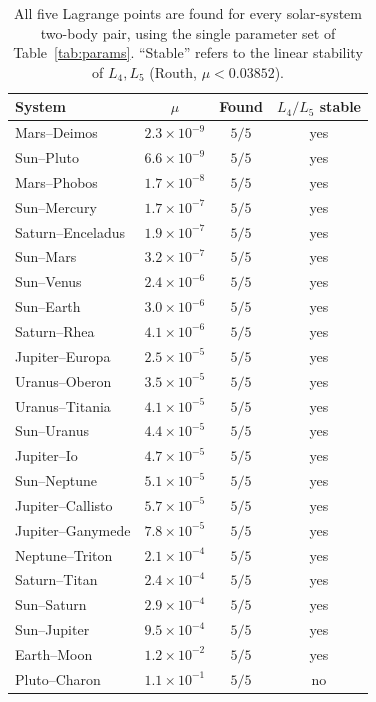 \documentclass[aip,preprint,amsmath,amssymb,floatfix]{revtex4-2}
\begin{document}
\begin{table}[ht]
\centering
\caption{All five Lagrange points are found for every solar-system two-body pair,
using the single parameter set of Table~\ref{tab:params}. ``Stable'' refers to
the linear stability of $L_4,L_5$ (Routh, $\mu<0.03852$).}
\label{tab:systems}
\begin{tabular}{lccc}
\toprule
System & $\mu$ & Found & $L_4/L_5$ stable\\
\midrule
Mars--Deimos      & $2.3\times10^{-9}$ & $5/5$ & yes\\
Sun--Pluto        & $6.6\times10^{-9}$ & $5/5$ & yes\\
Mars--Phobos      & $1.7\times10^{-8}$ & $5/5$ & yes\\
Sun--Mercury      & $1.7\times10^{-7}$ & $5/5$ & yes\\
Saturn--Enceladus & $1.9\times10^{-7}$ & $5/5$ & yes\\
Sun--Mars         & $3.2\times10^{-7}$ & $5/5$ & yes\\
Sun--Venus        & $2.4\times10^{-6}$ & $5/5$ & yes\\
Sun--Earth        & $3.0\times10^{-6}$ & $5/5$ & yes\\
Saturn--Rhea      & $4.1\times10^{-6}$ & $5/5$ & yes\\
Jupiter--Europa   & $2.5\times10^{-5}$ & $5/5$ & yes\\
Uranus--Oberon    & $3.5\times10^{-5}$ & $5/5$ & yes\\
Uranus--Titania   & $4.1\times10^{-5}$ & $5/5$ & yes\\
Sun--Uranus       & $4.4\times10^{-5}$ & $5/5$ & yes\\
Jupiter--Io       & $4.7\times10^{-5}$ & $5/5$ & yes\\
Sun--Neptune      & $5.1\times10^{-5}$ & $5/5$ & yes\\
Jupiter--Callisto & $5.7\times10^{-5}$ & $5/5$ & yes\\
Jupiter--Ganymede & $7.8\times10^{-5}$ & $5/5$ & yes\\
Neptune--Triton   & $2.1\times10^{-4}$ & $5/5$ & yes\\
Saturn--Titan     & $2.4\times10^{-4}$ & $5/5$ & yes\\
Sun--Saturn       & $2.9\times10^{-4}$ & $5/5$ & yes\\
Sun--Jupiter      & $9.5\times10^{-4}$ & $5/5$ & yes\\
Earth--Moon       & $1.2\times10^{-2}$ & $5/5$ & yes\\
Pluto--Charon     & $1.1\times10^{-1}$ & $5/5$ & no\\
\bottomrule
\end{tabular}
\end{table}
\end{document}
